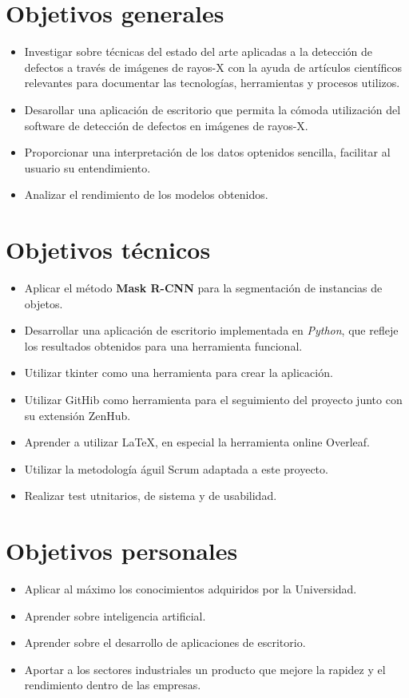 
\section{Objetivos generales}

\begin{itemize}
	\item Investigar sobre técnicas del estado del arte aplicadas a la detección de defectos a través de imágenes de rayos-X con la ayuda de artículos científicos relevantes para documentar las tecnologías, herramientas y procesos utilizos.
	\item Desarollar una aplicación de escritorio que permita la cómoda utilización del software de detección de defectos en imágenes de rayos-X.
	\item Proporcionar una interpretación de los datos optenidos sencilla, facilitar al usuario su entendimiento.
	\item Analizar el rendimiento de los modelos obtenidos.
\end{itemize}

\section{Objetivos técnicos}

\begin{itemize}
    \item Aplicar el método \textbf{Mask R-CNN} para la segmentación de instancias de objetos.
	\item Desarrollar una aplicación de escritorio implementada en \textit{Python}, que refleje los resultados obtenidos para una herramienta funcional.
	\item Utilizar tkinter como una herramienta para crear la aplicación.
	\item Utilizar GitHib como herramienta para el seguimiento del proyecto junto con su extensión ZenHub.
	\item Aprender a utilizar \LaTeX{}, en especial la herramienta online Overleaf.
	\item Utilizar la metodología águil Scrum adaptada a este proyecto.
	\item Realizar test utnitarios, de sistema y de usabilidad.
\end{itemize}

\section{Objetivos personales}

\begin{itemize}
    \item Aplicar al máximo los conocimientos adquiridos por la Universidad.
    \item Aprender sobre inteligencia artificial.
    \item Aprender sobre el desarrollo de aplicaciones de escritorio.
    \item Aportar a los sectores industriales un producto que mejore la rapidez y el rendimiento dentro de las empresas.
\end{itemize}
